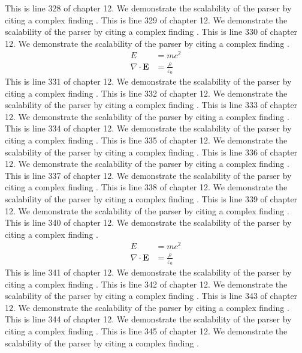 This is line 328 of chapter 12. We demonstrate the scalability of the parser by citing a complex finding \cite{ref12_328}.
This is line 329 of chapter 12. We demonstrate the scalability of the parser by citing a complex finding \cite{ref12_329}.
This is line 330 of chapter 12. We demonstrate the scalability of the parser by citing a complex finding \cite{ref12_330}.
\begin{align*}
  E &= mc^2 \\
  \nabla \cdot \mathbf{E} &= \frac{\rho}{\varepsilon_0}
\end{align*}
This is line 331 of chapter 12. We demonstrate the scalability of the parser by citing a complex finding \cite{ref12_331}.
This is line 332 of chapter 12. We demonstrate the scalability of the parser by citing a complex finding \cite{ref12_332}.
This is line 333 of chapter 12. We demonstrate the scalability of the parser by citing a complex finding \cite{ref12_333}.
This is line 334 of chapter 12. We demonstrate the scalability of the parser by citing a complex finding \cite{ref12_334}.
This is line 335 of chapter 12. We demonstrate the scalability of the parser by citing a complex finding \cite{ref12_335}.
This is line 336 of chapter 12. We demonstrate the scalability of the parser by citing a complex finding \cite{ref12_336}.
This is line 337 of chapter 12. We demonstrate the scalability of the parser by citing a complex finding \cite{ref12_337}.
This is line 338 of chapter 12. We demonstrate the scalability of the parser by citing a complex finding \cite{ref12_338}.
This is line 339 of chapter 12. We demonstrate the scalability of the parser by citing a complex finding \cite{ref12_339}.
This is line 340 of chapter 12. We demonstrate the scalability of the parser by citing a complex finding \cite{ref12_340}.
\begin{align*}
  E &= mc^2 \\
  \nabla \cdot \mathbf{E} &= \frac{\rho}{\varepsilon_0}
\end{align*}
This is line 341 of chapter 12. We demonstrate the scalability of the parser by citing a complex finding \cite{ref12_341}.
This is line 342 of chapter 12. We demonstrate the scalability of the parser by citing a complex finding \cite{ref12_342}.
This is line 343 of chapter 12. We demonstrate the scalability of the parser by citing a complex finding \cite{ref12_343}.
This is line 344 of chapter 12. We demonstrate the scalability of the parser by citing a complex finding \cite{ref12_344}.
This is line 345 of chapter 12. We demonstrate the scalability of the parser by citing a complex finding \cite{ref12_345}.
